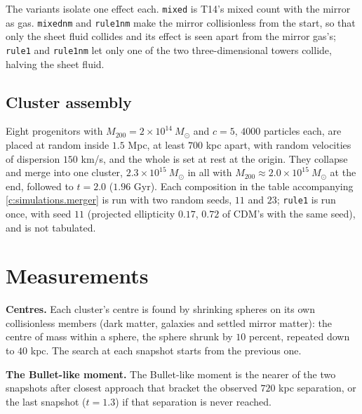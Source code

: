 \documentclass[11pt]{article}
\theoremstyle{definition}
\theoremstyle{plain}
\providecommand{\Msun}{}\renewcommand{\Msun}{M_{\odot}}
\begin{document}
The variants isolate one effect each. \texttt{mixed} is T14's mixed count with the mirror as gas. \texttt{mixednm} and \texttt{rule1nm} make the mirror collisionless from the start, so that only the sheet fluid collides and its effect is seen apart from the mirror gas's; \texttt{rule1} and \texttt{rule1nm} let only one of the two three-dimensional towers collide, halving the sheet fluid.

\subsection*{Cluster assembly}
\label{c:note.simulations.setting-cluster-assembly}
Eight progenitors with $M_{200} = 2 \times 10^{14}\ \Msun$ and $c = 5$, $4000$ particles each, are placed at random inside $1.5$ Mpc, at least $700$ kpc apart, with random velocities of dispersion $150$ km/s, and the whole is set at rest at the origin. They collapse and merge into one cluster, $2.3 \times 10^{15}\ \Msun$ in all with $M_{200} \approx 2.0 \times 10^{15}\ \Msun$ at the end, followed to $t = 2.0$ ($1.96$ Gyr). Each composition in the table accompanying \ref{c:simulations.merger} is run with two random seeds, $11$ and $23$; \texttt{rule1} is run once, with seed $11$ (projected ellipticity $0.17$, $0.72$ of CDM's with the same seed), and is not tabulated.

\section{Measurements}

\label{c:note.simulations.setting-measurements}
\textbf{Centres.} Each cluster's centre is found by shrinking spheres on its own collisionless members (dark matter, galaxies and settled mirror matter): the centre of mass within a sphere, the sphere shrunk by $10$ percent, repeated down to $40$ kpc. The search at each snapshot starts from the previous one.

\label{c:note.simulations.setting-measurements-2}
\textbf{The Bullet-like moment.} The Bullet-like moment is the nearer of the two snapshots after closest approach that bracket the observed $720$ kpc separation, or the last snapshot ($t = 1.3$) if that separation is never reached.
\end{document}
